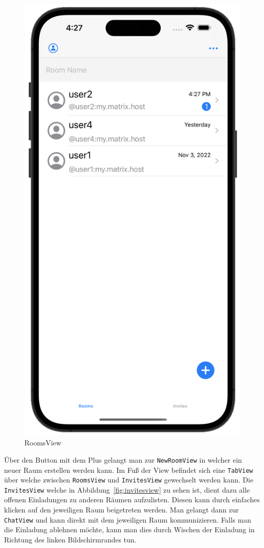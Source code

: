     \begin{figure}[h]
        \includegraphics[scale=0.5]{rooms_white}
        \centering
        \caption{RoomsView}\label{fig:roomsview}
    \end{figure}
    Über den Button mit dem Plus gelangt man zur \texttt{NewRoomView} in welcher ein neuer Raum erstellen werden kann.
    Im Fuß der View befindet sich eine \texttt{TabView} über welche zwischen \texttt{RoomsView} und \texttt{InvitesView} gewechselt werden kann.
    Die \texttt{InvitesView} welche in Abbildung~\ref{fig:invitesview} zu sehen ist, dient dazu alle offenen Einladungen zu anderen Räumen aufzulisten.
    Diesen kann durch einfaches klicken auf den jeweiligen Raum beigetreten werden.
    Man gelangt dann zur \texttt{ChatView} und kann direkt mit dem jeweiligen Raum kommunizieren.
    Falls man die Einladung ablehnen möchte, kann man dies durch Wischen der Einladung in Richtung des linken Bildschirmrandes tun.

